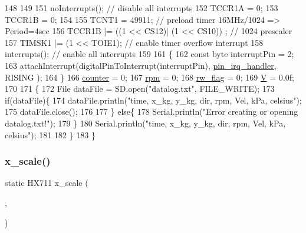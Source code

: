 \begin{DoxyCode}
148 
149     
151     noInterrupts();           \textcolor{comment}{// disable all interrupts}
152     TCCR1A  = 0;
153     TCCR1B  = 0;
154     
155     TCNT1   = 49911;            \textcolor{comment}{// preload timer 16MHz/1024 => Period=4sec}
156     TCCR1B |= ((1 << CS12)| (1 << CS10)) ;    \textcolor{comment}{// 1024 prescaler }
157     TIMSK1 |= (1 << TOIE1);   \textcolor{comment}{// enable timer overflow interrupt}
158     interrupts();             \textcolor{comment}{// enable all interrupts}
159 
161     \{
162         \textcolor{keyword}{const} byte interruptPin = 2;
163         attachInterrupt(digitalPinToInterrupt(interruptPin), \mbox{\hyperlink{windsensor_8ino_a326020c34cf7bde02de2cafe8f9e62c1}{pin\_irq\_handler}}, RISING );
164     \}
166     \mbox{\hyperlink{windsensor_8ino_a3d4f497af9a194d9e03e5d9a9b0ee67d}{counter}} = 0;
167     \mbox{\hyperlink{windsensor_8ino_a1571ae0d208fed39e6690affb377db08}{rpm}}     = 0;
168     \mbox{\hyperlink{windsensor_8ino_a2ff89ca4ee93f613d9003947a163355b}{rw\_flag}} = 0;
169     \mbox{\hyperlink{windsensor_8ino_aa4fd0d57d98c7d4f1072f2edd19ab2ed}{V}}       = 0.0f;
170 
171     \{
172         File dataFile = SD.open(\textcolor{stringliteral}{"datalog.txt"}, FILE\_WRITE);
173         \textcolor{keywordflow}{if}(dataFile)\{
174             dataFile.println(\textcolor{stringliteral}{"time, x\_kg, y\_kg, dir, rpm, Vel, kPa, celsius"});
175             dataFile.close();
176             
177         \} \textcolor{keywordflow}{else}\{
178             Serial.println(\textcolor{stringliteral}{"Error creating or opening datalog.txt!"});
179         \}
180         Serial.println(\textcolor{stringliteral}{"time, x\_kg, y\_kg,  dir, rpm, Vel, kPa, celsius"});
181         
182     \}
183 \}
\end{DoxyCode}
\mbox{\label{windsensor_8ino_a63487c630a07521a6eb55b8f607c193f}} 
\subsubsection{\texorpdfstring{x\+\_\+scale()}{x\_scale()}}
{\footnotesize\ttfamily static H\+X711 x\+\_\+scale (\begin{DoxyParamCaption}\item[{\mbox{\hyperlink{windsensor_8ino_a1536230053989f05113870b57c81b368}{D\+O\+U\+TA}}}]{,  }\item[{\mbox{\hyperlink{windsensor_8ino_a6a5dcd886a8a52cab810eb8a461c96f5}{C\+L\+KA}}}]{ }\end{DoxyParamCaption})\hspace{0.3cm}{\ttfamily [static]}}



